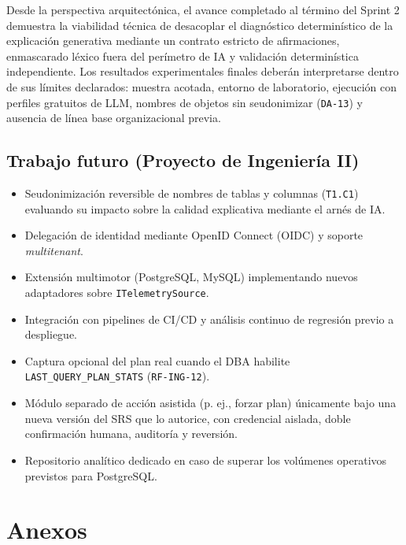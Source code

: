 \documentclass[12pt,a4paper]{article}
\begin{document}
Desde la perspectiva arquitectónica, el avance completado al término del Sprint 2 demuestra la viabilidad técnica de desacoplar el diagnóstico determinístico de la explicación generativa mediante un contrato estricto de afirmaciones, enmascarado léxico fuera del perímetro de IA y validación determinística independiente. Los resultados experimentales finales deberán interpretarse dentro de sus límites declarados: muestra acotada, entorno de laboratorio, ejecución con perfiles gratuitos de LLM, nombres de objetos sin seudonimizar (\texttt{DA-13}) y ausencia de línea base organizacional previa.

\subsection{Trabajo futuro (Proyecto de Ingeniería II)}

\begin{itemize}[leftmargin=1.5em]
    \item Seudonimización reversible de nombres de tablas y columnas (\texttt{T1.C1}) evaluando su impacto sobre la calidad explicativa mediante el arnés de IA.
    \item Delegación de identidad mediante OpenID Connect (OIDC) y soporte \textit{multitenant}.
    \item Extensión multimotor (PostgreSQL, MySQL) implementando nuevos adaptadores sobre \texttt{ITelemetrySource}.
    \item Integración con pipelines de CI/CD y análisis continuo de regresión previo a despliegue.
    \item Captura opcional del plan real cuando el DBA habilite \texttt{LAST\_QUERY\_PLAN\_STATS} (\texttt{RF-ING-12}).
    \item Módulo separado de acción asistida (p. ej., forzar plan) únicamente bajo una nueva versión del SRS que lo autorice, con credencial aislada, doble confirmación humana, auditoría y reversión.
    \item Repositorio analítico dedicado en caso de superar los volúmenes operativos previstos para PostgreSQL.
\end{itemize}

\section{Anexos}
\end{document}
